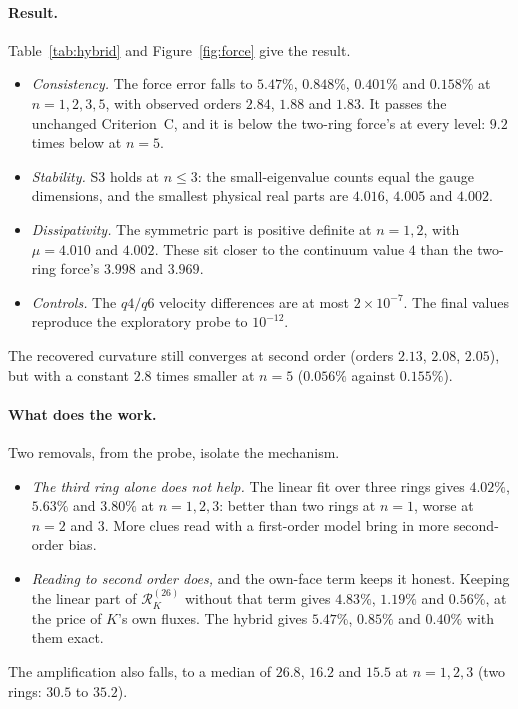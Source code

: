 \documentclass[11pt]{article}
\theoremstyle{definition}
\theoremstyle{remark}
\newcommand{\BW}{Criterion~C}
\newcommand{\cR}{\mathcal{R}}
\begin{document}
\paragraph{Result.} Table~\ref{tab:hybrid} and Figure~\ref{fig:force} give the result.
\begin{itemize}
  \item \emph{Consistency.} The force error falls to $5.47\%$, $0.848\%$, $0.401\%$ and
    $0.158\%$ at $n=1,2,3,5$, with observed orders $2.84$, $1.88$ and $1.83$. It passes the
    unchanged \BW{}, and it is below the two-ring force's at every level: $9.2$ times
    below at $n=5$.
  \item \emph{Stability.} S3 holds at $n\le3$: the small-eigenvalue counts equal the gauge
    dimensions, and the smallest physical real parts are $4.016$, $4.005$ and $4.002$.
  \item \emph{Dissipativity.} The symmetric part is positive definite at $n=1,2$, with
    $\mu=4.010$ and $4.002$. These sit closer to the continuum value $4$ than the two-ring
    force's $3.998$ and $3.969$.
  \item \emph{Controls.} The $q4/q6$ velocity differences are at most $2\times10^{-7}$. The
    final values reproduce the exploratory probe to $10^{-12}$.
\end{itemize}
The recovered curvature still converges at second order (orders $2.13$, $2.08$, $2.05$), but
with a constant $2.8$ times smaller at $n=5$ ($0.056\%$ against $0.155\%$).



\paragraph{What does the work.} Two removals, from the probe, isolate the mechanism.
\begin{itemize}
  \item \emph{The third ring alone does not help.} The linear fit over three rings gives
    $4.02\%$, $5.63\%$ and $3.80\%$ at $n=1,2,3$: better than two rings at $n=1$, worse at
    $n=2$ and $3$. More clues read with a first-order model bring in more second-order bias.
  \item \emph{Reading to second order does,} and the own-face term keeps it honest. Keeping
    the linear part of $\cR^{(26)}_K$ without that term gives $4.83\%$, $1.19\%$ and $0.56\%$,
    at the price of $K$'s own fluxes. The hybrid gives $5.47\%$, $0.85\%$ and $0.40\%$ with
    them exact.
\end{itemize}
The amplification also falls, to a median of $26.8$, $16.2$ and $15.5$ at $n=1,2,3$ (two
rings: $30.5$ to $35.2$).
\end{document}
